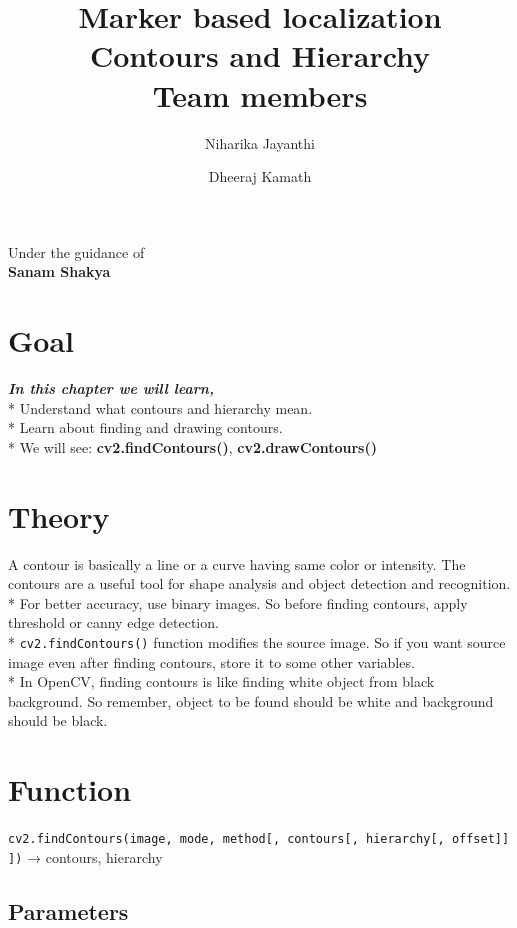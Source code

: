 \documentclass[]{article}
\date{}
\title {Marker based localization \\ [10pt]
	Contours and Hierarchy  \\[25pt] Team members }
\author {Niharika Jayanthi \and Dheeraj Kamath}
\begin{document}
\maketitle
\begin{center}
	\begin{large}
		Under the guidance of\\
		\textbf{Sanam Shakya}\\
		\vspace{0.5in}
	\end{large}
\end{center}
\section{Goal}\label{goal}

\emph{\textbf{In this chapter we will learn,}}\\
* Understand what contours and hierarchy mean.\\
* Learn about finding and drawing contours.\\
* We will see: \textbf{cv2.findContours()}, \textbf{cv2.drawContours()}

\section{Theory}\label{theory}

A contour is basically a line or a curve having same color or intensity.
The contours are a useful tool for shape analysis and object detection
and recognition. * For better accuracy, use binary images. So before
finding contours, apply threshold or canny edge detection.\\
* \texttt{cv2.findContours()} function modifies the source image. So if
you want source image even after finding contours, store it to some
other variables.\\
* In OpenCV, finding contours is like finding white object from black
background. So remember, object to be found should be white and
background should be black.

\section{Function}\label{function}

\texttt{cv2.findContours(image,\ mode,\ method{[},\ contours{[},\ hierarchy{[},\ offset{]}{]}{]})}
→ contours, hierarchy

\subsection{Parameters}\label{parameters}
\end{document}

